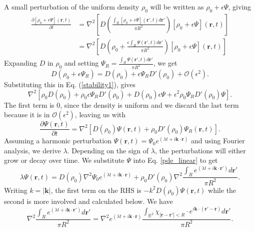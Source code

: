 \documentclass{article}
\renewcommand{\vec}[1]{\boldsymbol{#1}}
\begin{document}
A small perturbation of the uniform density $\rho_0$ will be written as $\rho_0 + \epsilon \Psi$, giving
\begin{align}
    \frac{\partial[\rho_0 + \epsilon \Psi](\vec{r},t)}{\partial t} &= \nabla^2\left[D\left(\frac{\int_{R} [\rho_0+\epsilon \Psi](\vec{r}',t)d\vec{r}'}{\pi R^2}\right)[\rho_0+\epsilon \Psi](\vec{r},t)\right]\\
    &= \nabla^2\left[D\left(\rho_0+\frac{\epsilon\int_{R} \Psi(\vec{r}',t)d\vec{r}'}{\pi R^2}\right)[\rho_0+\epsilon \Psi](\vec{r},t)\right] \label{stability1}
\end{align}
Expanding $D$ in $\rho_0$ and setting $\Psi_R = \frac{\int_{R} \Psi(\vec{r}',t)d\vec{r}'}{\pi R^2}$, we get 
\begin{equation}
    D(\rho_0+\epsilon \Psi_R) = D(\rho_0) + \epsilon \Psi_R D'(\rho_0) + \mathcal{O}(\epsilon^2).
\end{equation}
Substituting this in Eq. (\ref{stability1}), gives
\begin{equation}
\nabla^2\left[\rho_0 D(\rho_0) + \rho_0\epsilon \Psi_R D'(\rho_0)+ D(\rho_0)\epsilon \Psi + \epsilon^2 \rho_0 \Psi_R D'(\rho_0) \Psi\right].
\end{equation}
The first term is $0$, since the density is uniform and we discard the last term because it is in $\mathcal{O}(\epsilon^2)$, leaving us with
\begin{equation} \label{pde_linear}
    \frac{\partial \Psi(\vec{r},t)}{\partial t} = \nabla^2\left[ D(\rho_0) \Psi(\vec{r},t)+\rho_0  D'(\rho_0)\Psi_R(\vec{r},t)  \right].
\end{equation}
Assuming a harmonic perturbation $\Psi(\vec{r}, t) = \Psi_0 e^{(\lambda t + i \vec{k} \cdot \vec{r})}$ and using Fourier analysis, we derive $\lambda$.
Depending on the sign of $\lambda$, the perturbations will either grow or decay over time.
We substitute $\Psi$ into Eq. \ref{pde_linear} to get
\begin{equation} \label{pde_substituted}
    \lambda \Psi(\vec{r},t) = D(\rho_0) \nabla^2\Psi_0 e^{(\lambda t + i \vec{k} \cdot \vec{r})} +  \rho_0  D'(\rho_0) \nabla^2\frac{\int_{R} e^{(\lambda t + i \vec{k} \cdot \vec{r'})}d\vec{r'}}{\pi R^2}.
\end{equation}
Writing $k=|\vec{k}|$, the first term on the RHS is $-k^2D(\rho_0)\Psi(\vec{r},t)$ while the second is more involved and calculated below.
We have 
\begin{equation} 
 \nabla^2\frac{\int_{R} e^{(\lambda t + i \vec{k} \cdot \vec{r'})}d\vec{r'}}{\pi R^2} = \nabla^2e^{(\lambda t + i \vec{k} \cdot \vec{r})}\frac{\int_{\mathbb{R}^2}\chi_{|\vec{r}-\vec{r'}|<R} \cdot e^{ i \vec{k} \cdot (\vec{r'}-\vec{r})}d\vec{r'}}{\pi R^2}.
\end{equation}
\end{document}
